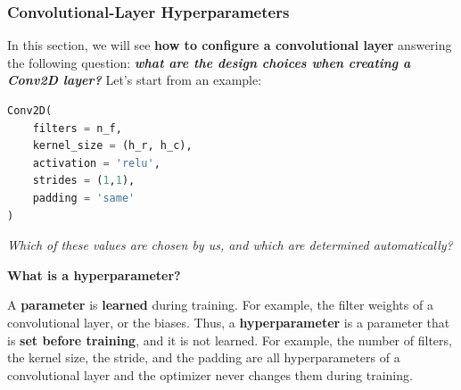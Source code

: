 \subsubsection{Convolutional-Layer Hyperparameters}\label{sec:convolutional-layer-hyperparameters}

In this section, we will see \textbf{how to configure a convolutional layer} answering the following question: \emph{\textbf{what are the design choices when creating a Conv2D layer?}} Let's start from an example:
\begin{lstlisting}[language=Python]
Conv2D(
    filters = n_f,
    kernel_size = (h_r, h_c),
    activation = 'relu',
    strides = (1,1),
    padding = 'same'
)
\end{lstlisting}
\emph{Which of these values are chosen by us, and which are determined automatically?}

\highspace
\begin{flushleft}
    \textcolor{Green3}{ \textbf{What is a hyperparameter?}}
\end{flushleft}
A \textbf{parameter} is \textbf{learned} during training. For example, the filter weights of a convolutional layer, or the biases. Thus, a \textbf{hyperparameter} is a parameter that is \textbf{set before training}, and it is not learned. For example, the number of filters, the kernel size, the stride, and the padding are all hyperparameters of a convolutional layer and the optimizer never changes them during training.

